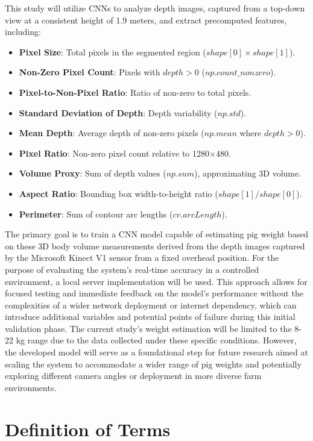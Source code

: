 {This study will utilize CNNs to analyze depth images, captured from a top-down view at a consistent height of 1.9 meters, and extract precomputed features, including:
\begin{itemize}
	\item \textbf{Pixel Size}: Total pixels in the segmented region ($shape[0] \times shape[1]$).
	\item \textbf{Non-Zero Pixel Count}: Pixels with $depth > 0$ ($np.count\_nonzero$).
	\item \textbf{Pixel-to-Non-Pixel Ratio}: Ratio of non-zero to total pixels.
	\item \textbf{Standard Deviation of Depth}: Depth variability ($np.std$).
	\item \textbf{Mean Depth}: Average depth of non-zero pixels ($np.mean$ where $depth > 0$).
	\item \textbf{Pixel Ratio}: Non-zero pixel count relative to 1280$\times$480.
	\item \textbf{Volume Proxy}: Sum of depth values ($np.sum$), approximating 3D volume.
	\item \textbf{Aspect Ratio}: Bounding box width-to-height ratio ($shape[1] / shape[0]$).
	\item \textbf{Perimeter}: Sum of contour arc lengths ($cv.arcLength$).
\end{itemize}
The primary goal is to train a CNN model capable of estimating pig weight based on these 3D body volume measurements derived from the depth images captured by the Microsoft Kinect V1 sensor from a fixed overhead position. For the purpose of evaluating the system's real-time accuracy in a controlled environment, a local server implementation will be used. This approach allows for focused testing and immediate feedback on the model's performance without the complexities of a wider network deployment or internet dependency, which can introduce additional variables and potential points of failure during this initial validation phase. The current study's weight estimation will be limited to the 8-22 kg range due to the data collected under these specific conditions. However, the developed model will serve as a foundational step for future research aimed at scaling the system to accommodate a wider range of pig weights and potentially exploring different camera angles or deployment in more diverse farm environments.




\section{Definition of Terms}

}
